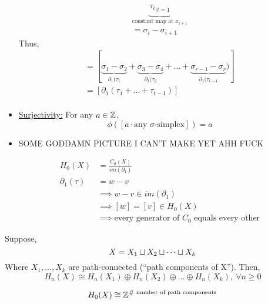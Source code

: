 \documentclass[../notes.tex]{subfiles}
\begin{document}
\begin{itemize}
\begin{align*}
            \underbrace{{\tau_i}_{|t=1}}_{\text{constant map at $x_{i+1}$}}\\
            =\sigma_i-\sigma_{i+1}
        \end{align*}
        Thus,
        \begin{align*}
            [\alpha]=[
            \underbrace{\sigma_1-\sigma_2}_{\partial_1(\tau_1}+
            \underbrace{\sigma_3-\sigma_4}_{\partial_1(\tau_2}+
            \dots+
            \underbrace{\sigma_{r-1}-\sigma_r}_{\partial_1(\tau_{t-1}})]\\
            =[\partial_1(\tau_1+\dots+\tau_{t-1})]\\
        \end{align*}
    \item \underline{Surjectivity:} For any $a\in \mathbb{Z}$,
        \[
            \phi([a\cdot\text{any $\sigma$-simplex}])=a
        \]
    \item {} 
        \begin{center}
            \LARGE{SOME GODDAMN PICTURE I CAN'T MAKE YET AHH FUCK}
        \end{center}
        \begin{align*}
            H_0(X)&=\frac{C_0(X)}{im(\partial_1)}\\
            \partial_1(\tau)&=w-v\\
            &\implies w-v\in im(\partial_1)\\
            &\implies [w]=[v]\in H_0(X)\\
            &\implies \text{every generator of $C_0$ equals every other}
        \end{align*}
\end{itemize}
\begin{theorem}
    Suppose,
    \[
        X=X_1\sqcup X_2 \sqcup \dots \sqcup X_k\\
    \]
    Where $X_1,\dots,X_k$ are path-connected (``path components of X''). Then,
    \[
        H_n(X)\cong H_n(X_1)\oplus H_n(X_2)\oplus\dots\oplus H_n(X_k),\ \forall n\geq 0
    \]
\end{theorem}
\begin{corollary}
    \[
        H_0(X)\cong \mathbb{Z}^{\text{$\#$ number of path components}}
    \]
\end{corollary}
\end{document}
